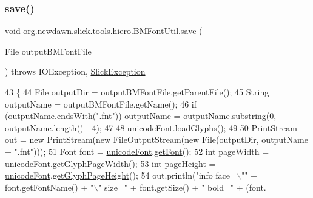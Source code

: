 \subsubsection{\texorpdfstring{save()}{save()}}
{\footnotesize\ttfamily void org.\+newdawn.\+slick.\+tools.\+hiero.\+B\+M\+Font\+Util.\+save (\begin{DoxyParamCaption}\item[{File}]{output\+B\+M\+Font\+File }\end{DoxyParamCaption}) throws I\+O\+Exception, \mbox{\hyperlink{classorg_1_1newdawn_1_1slick_1_1_slick_exception}{Slick\+Exception}}\hspace{0.3cm}{\ttfamily [inline]}}


\begin{DoxyCode}
43                                                                                 \{
44         File outputDir = outputBMFontFile.getParentFile();
45         String outputName = outputBMFontFile.getName();
46         \textcolor{keywordflow}{if} (outputName.endsWith(\textcolor{stringliteral}{".fnt"})) outputName = outputName.substring(0, outputName.length() - 4);
47 
48         \mbox{\hyperlink{classorg_1_1newdawn_1_1slick_1_1tools_1_1hiero_1_1_b_m_font_util_aabb529febc55852008fc0d4436186dd3}{unicodeFont}}.\mbox{\hyperlink{classorg_1_1newdawn_1_1slick_1_1_unicode_font_abf14d8ad33f80b66e14990417bd04088}{loadGlyphs}}();
49 
50         PrintStream out = \textcolor{keyword}{new} PrintStream(\textcolor{keyword}{new} FileOutputStream(\textcolor{keyword}{new} File(outputDir, outputName + \textcolor{stringliteral}{".fnt"})));
51         Font font = \mbox{\hyperlink{classorg_1_1newdawn_1_1slick_1_1tools_1_1hiero_1_1_b_m_font_util_aabb529febc55852008fc0d4436186dd3}{unicodeFont}}.\mbox{\hyperlink{classorg_1_1newdawn_1_1slick_1_1_unicode_font_a79b0d204d4dc075991bd0a3625722521}{getFont}}();
52         \textcolor{keywordtype}{int} pageWidth = \mbox{\hyperlink{classorg_1_1newdawn_1_1slick_1_1tools_1_1hiero_1_1_b_m_font_util_aabb529febc55852008fc0d4436186dd3}{unicodeFont}}.\mbox{\hyperlink{classorg_1_1newdawn_1_1slick_1_1_unicode_font_a1a033ce1ceec45ced33842cdf6e25670}{getGlyphPageWidth}}();
53         \textcolor{keywordtype}{int} pageHeight = \mbox{\hyperlink{classorg_1_1newdawn_1_1slick_1_1tools_1_1hiero_1_1_b_m_font_util_aabb529febc55852008fc0d4436186dd3}{unicodeFont}}.\mbox{\hyperlink{classorg_1_1newdawn_1_1slick_1_1_unicode_font_ad84a713b212682b5e7981c72b63d8703}{getGlyphPageHeight}}();
54         out.println(\textcolor{stringliteral}{"info face=\(\backslash\)""} + font.getFontName() + \textcolor{stringliteral}{"\(\backslash\)" size="} + font.getSize() + \textcolor{stringliteral}{" bold="} + (font.

\end{DoxyCode}
